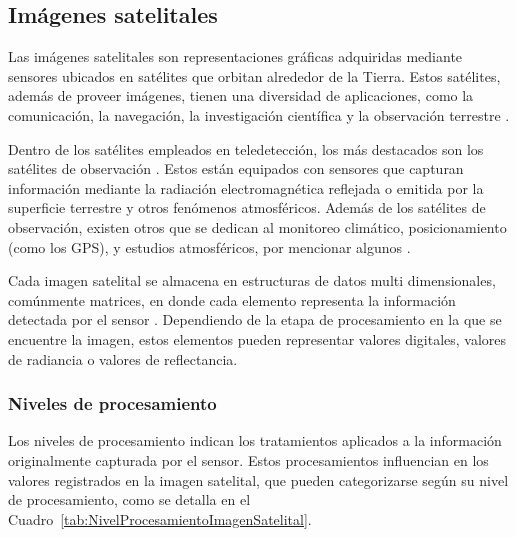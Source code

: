 \subsection{Imágenes satelitales}

Las imágenes satelitales son representaciones gráficas adquiridas mediante sensores ubicados en satélites que orbitan alrededor de la Tierra. Estos satélites, además de proveer imágenes, tienen una diversidad de aplicaciones, como la comunicación, la navegación, la investigación científica y la observación terrestre \cite{canada2007fundamentals}.

Dentro de los satélites empleados en teledetección, los más destacados son los satélites de observación \cite{canada2007fundamentals}. Estos están equipados con sensores que capturan información mediante la radiación electromagnética reflejada o emitida por la superficie terrestre y otros fenómenos atmosféricos. Además de los satélites de observación, existen otros que se dedican al monitoreo climático, posicionamiento (como los GPS), y estudios atmosféricos, por mencionar algunos \cite{jensen2016introductory}.

Cada imagen satelital se almacena en estructuras de datos multi dimensionales, comúnmente matrices, en donde cada elemento representa la información detectada por el sensor \cite{chuvieco2016fundamentals}. Dependiendo de la etapa de procesamiento en la que se encuentre la imagen, estos elementos pueden representar valores digitales, valores de radiancia o valores de reflectancia.

\subsubsection{Niveles de procesamiento}

Los niveles de procesamiento indican los tratamientos aplicados a la información originalmente capturada por el sensor. Estos procesamientos influencian en los valores registrados en la imagen satelital, que pueden categorizarse según su nivel de procesamiento, como se detalla en el Cuadro~\ref{tab:NivelProcesamientoImagenSatelital}.

